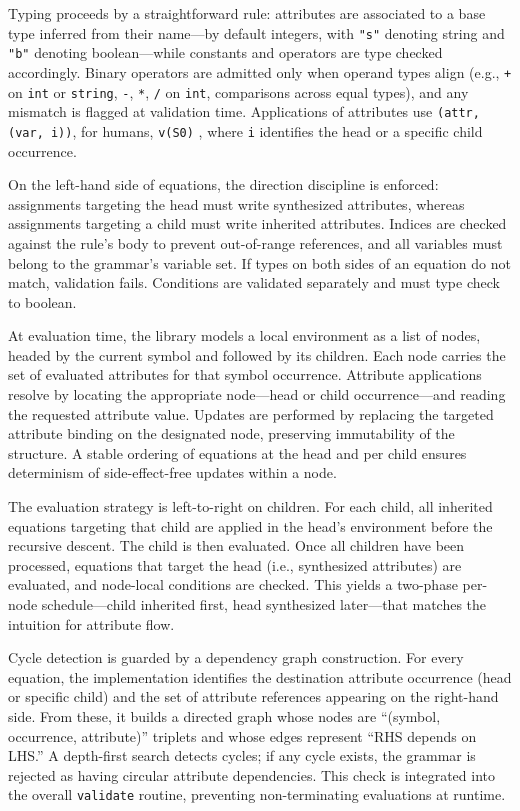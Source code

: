 Typing proceeds by a straightforward rule: attributes are associated to a base type inferred from their name---by default integers, with \texttt{"s"} 
denoting string and \texttt{"b"} denoting boolean---while constants and operators are type checked accordingly. Binary operators are admitted only when 
operand types align (e.g., \texttt{+} on \texttt{int} or \texttt{string}, \texttt{-}, \texttt{*}, \texttt{/} on \texttt{int}, comparisons across equal 
types), and any mismatch is flagged at validation time. Applications of attributes use \texttt{(attr, (var, i))}, for humans, \texttt{v(S0)} , where \texttt{i} identifies the head 
or a specific child occurrence.

On the left-hand side of equations, the direction discipline is enforced: assignments targeting the head must write synthesized attributes, whereas 
assignments targeting a child must write inherited attributes. Indices are checked against the rule's body to prevent out-of-range references, and 
all variables must belong to the grammar's variable set. If types on both sides of an equation do not match, validation fails. Conditions are validated 
separately and must type check to boolean.

At evaluation time, the library models a local environment as a list of nodes, headed by the current symbol and followed by its children. Each node 
carries the set of evaluated attributes for that symbol occurrence. Attribute applications resolve by locating the appropriate node---head or child 
occurrence---and reading the requested attribute value. Updates are performed by replacing the targeted attribute binding on the designated node, 
preserving immutability of the structure. A stable ordering of equations at the head and per child ensures determinism of side-effect-free updates 
within a node.

The evaluation strategy is left-to-right on children. For each child, all inherited equations targeting that child are applied in the head's environment 
before the recursive descent. The child is then evaluated. Once all children have been processed, equations that target the head (i.e., synthesized 
attributes) are evaluated, and node-local conditions are checked. This yields a two-phase per-node schedule---child inherited first, head synthesized 
later---that matches the intuition for attribute flow.

Cycle detection is guarded by a dependency graph construction. For every equation, the implementation identifies the destination attribute occurrence 
(head or specific child) and the set of attribute references appearing on the right-hand side. From these, it builds a directed graph whose nodes 
are ``(symbol, occurrence, attribute)'' triplets and whose edges represent ``RHS depends on LHS.'' A depth-first search detects cycles; if any cycle 
exists, the grammar is rejected as having circular attribute dependencies. This check is integrated into the overall \texttt{validate} routine, 
preventing non-terminating evaluations at runtime.

